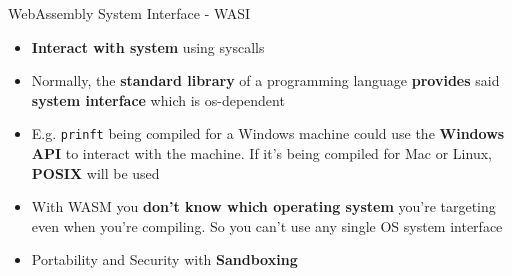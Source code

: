 \documentclass{beamer}
\begin{document}
\begin{frame}{WebAssembly System Interface - WASI}
\begin{itemize} 
    \item \textbf{Interact with system} using syscalls
    \item Normally, the \textbf{standard library} of a programming language \textbf{provides} said \textbf{system interface} which is os-dependent
    \item E.g. \lstinline{prinft} being compiled for a Windows machine could use the \textbf{Windows API} to interact with the machine. If it's being compiled for Mac or Linux, \textbf{POSIX} will be used
    \item With WASM you \textbf{don't know which operating system} you're targeting even when you're compiling. So you can't use any single OS system interface 
    \item Portability and Security with \textbf{Sandboxing}
\end{itemize}
\end{frame}

\end{document}
